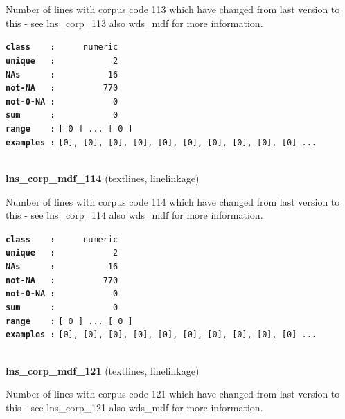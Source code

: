 \documentclass[]{article}
\begin{document}
Number of lines with corpus code 113 which have changed from last
version to this - see lns\_corp\_113 also wds\_mdf for more information.

\textbf{\texttt{class\ \ \ \ :}} \texttt{~~~~~numeric}\\
\textbf{\texttt{unique\ \ \ :}} \texttt{~~~~~~~~~~~2}\\
\textbf{\texttt{NAs\ \ \ \ \ \ :}} \texttt{~~~~~~~~~~16}\\
\textbf{\texttt{not-NA\ \ \ :}} \texttt{~~~~~~~~~770}\\
\textbf{\texttt{not-0-NA\ :}} \texttt{~~~~~~~~~~~0}\\
\textbf{\texttt{sum\ \ \ \ \ \ :}} \texttt{~~~~~~~~~~~0}\\
\textbf{\texttt{range\ \ \ \ :}}
\texttt{{[}\ 0\ {]}\ ...\ {[}\ 0\ {]}}\\
\textbf{\texttt{examples\ :}}
\texttt{{[}0{]},\ {[}0{]},\ {[}0{]},\ {[}0{]},\ {[}0{]},\ {[}0{]},\ {[}0{]},\ {[}0{]},\ {[}0{]},\ {[}0{]}\ ...}\\

~

\textbf{lns\_corp\_mdf\_114} (textlines, linelinkage)

Number of lines with corpus code 114 which have changed from last
version to this - see lns\_corp\_114 also wds\_mdf for more information.

\textbf{\texttt{class\ \ \ \ :}} \texttt{~~~~~numeric}\\
\textbf{\texttt{unique\ \ \ :}} \texttt{~~~~~~~~~~~2}\\
\textbf{\texttt{NAs\ \ \ \ \ \ :}} \texttt{~~~~~~~~~~16}\\
\textbf{\texttt{not-NA\ \ \ :}} \texttt{~~~~~~~~~770}\\
\textbf{\texttt{not-0-NA\ :}} \texttt{~~~~~~~~~~~0}\\
\textbf{\texttt{sum\ \ \ \ \ \ :}} \texttt{~~~~~~~~~~~0}\\
\textbf{\texttt{range\ \ \ \ :}}
\texttt{{[}\ 0\ {]}\ ...\ {[}\ 0\ {]}}\\
\textbf{\texttt{examples\ :}}
\texttt{{[}0{]},\ {[}0{]},\ {[}0{]},\ {[}0{]},\ {[}0{]},\ {[}0{]},\ {[}0{]},\ {[}0{]},\ {[}0{]},\ {[}0{]}\ ...}\\

~

\textbf{lns\_corp\_mdf\_121} (textlines, linelinkage)

Number of lines with corpus code 121 which have changed from last
version to this - see lns\_corp\_121 also wds\_mdf for more information.
\end{document}
